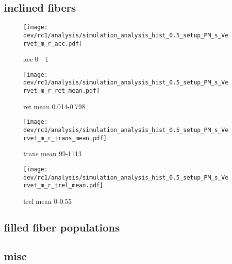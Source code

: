 \subsection{inclined fibers}
% 
\begin{figure}[!p]
\centering
\texttt{[image: dev/rc1/analysis/simulation\_analysis\_hist\_0.5\_setup\_PM\_s\_Vervet\_m\_r\_acc.pdf]} 
\caption[sim]{acc 0 - 1 \dummy{}}
\end{figure}
\begin{figure}[!p]
\centering
\texttt{[image: dev/rc1/analysis/simulation\_analysis\_hist\_0.5\_setup\_PM\_s\_Vervet\_m\_r\_ret\_mean.pdf]} 
\caption[sim]{ret mean 0.014-0.798 \dummy{}}
\end{figure}
\begin{figure}[!p]
\centering
\texttt{[image: dev/rc1/analysis/simulation\_analysis\_hist\_0.5\_setup\_PM\_s\_Vervet\_m\_r\_trans\_mean.pdf]} 
\caption[sim]{trans mean 99-1113 \dummy{}}
\end{figure}
\begin{figure}[!p]
\centering
\texttt{[image: dev/rc1/analysis/simulation\_analysis\_hist\_0.5\_setup\_PM\_s\_Vervet\_m\_r\_trel\_mean.pdf]} 
\caption[sim]{trel mean 0-0.55 \dummy{}}
\end{figure}
% 
\subsection{filled fiber populations}
\subsection{misc}
